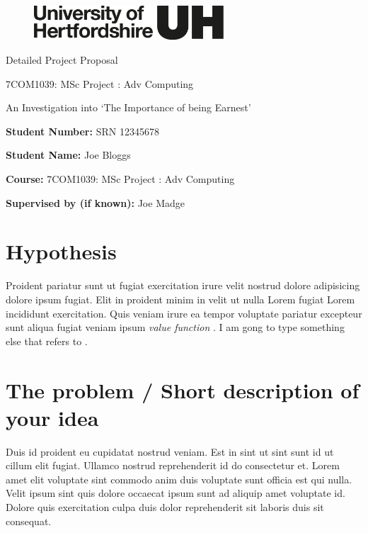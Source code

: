 \documentclass[a4paper, notitlepage, 11pt]{article}
\newcommand{\projecttitle}{An Investigation into `The Importance of being Earnest'}
\newcommand{\studentname}{Joe Bloggs}
\newcommand{\studentnumber}{SRN 12345678}
\newcommand{\supervisorname}{Joe Madge}
\newcommand{\doctype}{Detailed Project Proposal}
\newcommand{\coursecode}{7COM1039}
\newcommand{\coursedescr}{MSc Project : Adv Computing}
\begin{document}
\begin{figure}
    \vspace{-3mm}
    \includegraphics[width=7.1cm]{herts-logo-black.png}
\end{figure}
\noindent \huge{\doctype}\par
\vspace{-0.5em} \large \coursecode  : \coursedescr \par

\onehalfspacing

\vspace{2em}
\begin{tcolorbox}[width=\textwidth]
    \vspace{2em}
    \begin{center}
        {\Large \projecttitle} \newline
    \end{center}
    \vspace{2em}
    
    \textbf{Student Number:} \studentnumber \par 
    \textbf{Student Name:} \studentname \par
    \vspace{2em}
    
    \textbf{Course:} \coursecode : \coursedescr \par
    \textbf{Supervised by (if known):} \supervisorname
\end{tcolorbox}


\section{Hypothesis}
Proident pariatur sunt ut fugiat exercitation irure velit nostrud dolore adipisicing dolore ipsum fugiat. Elit in proident minim in velit ut nulla Lorem fugiat Lorem incididunt exercitation. Quis veniam irure ea tempor voluptate pariatur excepteur sunt aliqua fugiat veniam ipsum \emph{value function}  \citep{Sutton2018}.  I am gong to type something else that refers to \citep{Callaway2018:resource-rational-planning}.

\section{The problem / Short description of your idea}
Duis id proident eu cupidatat nostrud veniam. Est in sint ut sint sunt id ut cillum elit fugiat. Ullamco nostrud reprehenderit id do consectetur et. Lorem amet elit voluptate sint commodo anim duis voluptate sunt officia est qui nulla. Velit ipsum sint quis dolore occaecat ipsum sunt ad aliquip amet voluptate id. Dolore quis exercitation culpa duis dolor reprehenderit sit laboris duis sit consequat.
\end{document}
